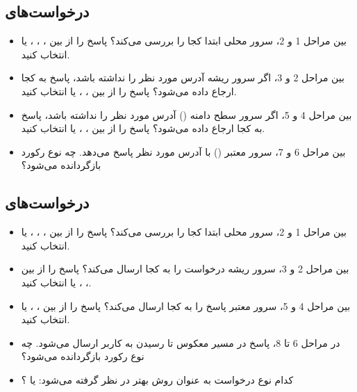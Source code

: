 \subsection*{درخواست‌های }

\begin{itemize}
\item بین مراحل 1 و 2، سرور  محلی ابتدا کجا را بررسی می‌کند؟ پاسخ را از بین ، ، ،  یا  انتخاب کنید.
\item بین مراحل 2 و 3، اگر سرور  ریشه آدرس  مورد نظر را نداشته باشد، پاسخ به کجا ارجاع داده می‌شود؟ پاسخ را از بین ، ،  یا  انتخاب کنید.
\item بین مراحل 4 و 5، اگر سرور  سطح دامنه () آدرس  مورد نظر را نداشته باشد، پاسخ به کجا ارجاع داده می‌شود؟ پاسخ را از بین ، ،  یا  انتخاب کنید.
\item بین مراحل 6 و 7، سرور  معتبر () با آدرس  مورد نظر پاسخ می‌دهد. چه نوع رکورد  بازگردانده می‌شود؟
\end{itemize}

\subsection*{درخواست‌های }

\begin{itemize}
\item بین مراحل 1 و 2، سرور  محلی ابتدا کجا را بررسی می‌کند؟ پاسخ را از بین ، ، ،  یا  انتخاب کنید.
\item بین مراحل 2 و 3، سرور  ریشه درخواست را به کجا ارسال می‌کند؟ پاسخ را از بین ، ،  یا  انتخاب کنید.
\item بین مراحل 4 و 5، سرور  معتبر پاسخ را به کجا ارسال می‌کند؟ پاسخ را از بین ، ،  یا  انتخاب کنید.
\item در مراحل 6 تا 8، پاسخ در مسیر معکوس تا رسیدن به کاربر ارسال می‌شود. چه نوع رکورد  بازگردانده می‌شود؟
\item کدام نوع درخواست به عنوان روش بهتر در نظر گرفته می‌شود:  یا ؟
\end{itemize}



